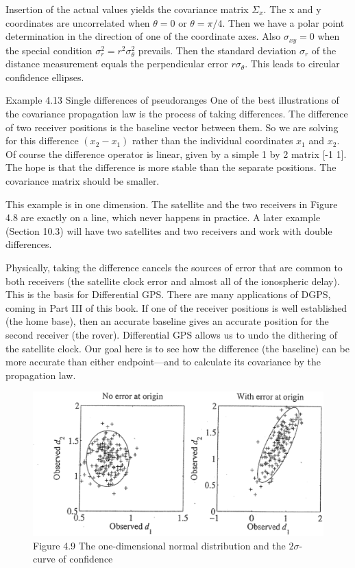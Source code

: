 Insertion of the actual values yields the covariance matrix $\Sigma_x$. The x and y coordinates are uncorrelated when $\theta=0$ or $\theta=\pi/4$. Then we have a polar point determination in the direction of one of the coordinate axes. Also $\sigma_{xy}=0$ when the special condition $\sigma^2_r=r^2\sigma^2_\theta$ prevails. Then the standard deviation $\sigma_r$ of the distance measurement equals the perpendicular error $r\sigma_\theta$. This leads to circular confidence ellipses.

Example 4.13\; Single differences of pseudoranges One of the best illustrations of the
covariance propagation law is the process of taking differences. The difference of two
receiver positions is the baseline vector between them. So we are solving for this difference $(x_2-x_1)$ rather than the individual coordinates $x_1$ and $x_2$. Of course the difference operator is linear, given by a simple 1 by 2 matrix [-1 1]. The hope is that the difference is more stable than the separate positions. The covariance matrix should be smaller.

This example is in one dimension. The satellite and the two receivers in Figure 4.8
are exactly on a line, which never happens in practice. A later example (Section 10.3) will
have two satellites and two receivers and work with double differences.

Physically, taking the difference cancels the sources of error that are common to
both receivers (the satellite clock error and almost all of the ionospheric delay). This is
the basis for Differential GPS. There are many applications of DGPS, coming in Part III
of this book. If one of the receiver positions is well established (the home base), then an accurate baseline gives an accurate position for the second receiver (the rover). Differential GPS allows us to undo the dithering of the satellite clock. Our goal here is to see how the difference (the baseline) can be more accurate than either endpoint—and to calculate its covariance by the propagation law.

\begin{figure}[h]
	\centering
	\includegraphics[width=0.7\linewidth]{TeX_files/Part02/chapter04/image/4-9}
	\caption{Figure 4.9 The one-dimensional normal distribution and the $2\sigma$-curve of confidence}
	\label{fig:4-9}
\end{figure}

